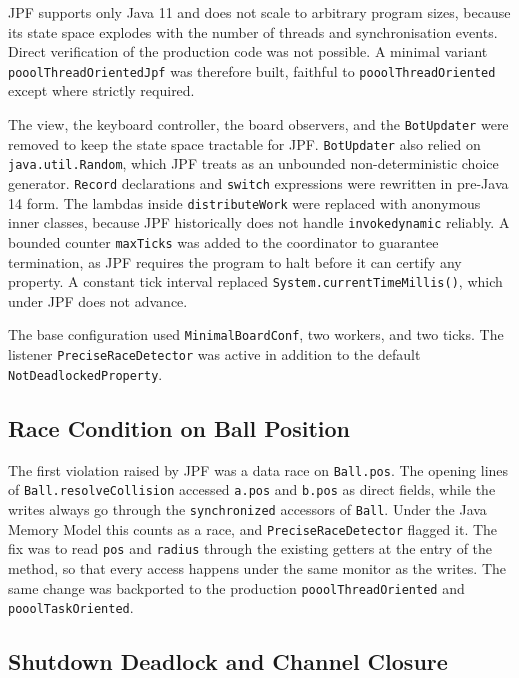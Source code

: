 \documentclass{scrartcl}
\begin{document}
JPF supports only Java 11 and does not scale to arbitrary program sizes, because its state space explodes with the number of threads and synchronisation events. Direct verification of the production code was not possible. A minimal variant \texttt{pooolThreadOrientedJpf} was therefore built, faithful to \texttt{pooolThreadOriented} except where strictly required.

The view, the keyboard controller, the board observers, and the \texttt{BotUpdater} were removed to keep the state space tractable for JPF. \texttt{BotUpdater} also relied on \texttt{java.util.Random}, which JPF treats as an unbounded non-deterministic choice generator. \texttt{Record} declarations and \texttt{switch} expressions were rewritten in pre-Java 14 form. The lambdas inside \texttt{distributeWork} were replaced with anonymous inner classes, because JPF historically does not handle \texttt{invokedynamic} reliably. A bounded counter \texttt{maxTicks} was added to the coordinator to guarantee termination, as JPF requires the program to halt before it can certify any property. A constant tick interval replaced \texttt{System.currentTimeMillis()}, which under JPF does not advance.

The base configuration used \texttt{MinimalBoardConf}, two workers, and two ticks. The listener \texttt{PreciseRaceDetector} was active in addition to the default \texttt{NotDeadlockedProperty}.

\subsection{Race Condition on Ball Position}

The first violation raised by JPF was a data race on \texttt{Ball.pos}. The opening lines of \texttt{Ball.resolveCollision} accessed \texttt{a.pos} and \texttt{b.pos} as direct fields, while the writes always go through the \texttt{synchronized} accessors of \texttt{Ball}. Under the Java Memory Model this counts as a race, and \texttt{PreciseRaceDetector} flagged it. The fix was to read \texttt{pos} and \texttt{radius} through the existing getters at the entry of the method, so that every access happens under the same monitor as the writes. The same change was backported to the production \texttt{pooolThreadOriented} and \texttt{pooolTaskOriented}.

\subsection{Shutdown Deadlock and Channel Closure}
\end{document}
